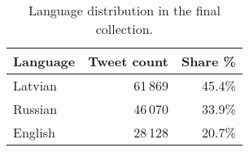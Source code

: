 \begin{table}[ht]
  \centering
  \begin{tabular}{lrr}
    \toprule
    Language & Tweet count & Share \% \\
    \midrule
    Latvian     & 61\,869  & 45.4\%  \\
    Russian     & 46\,070  & 33.9\%  \\
    English     & 28\,128  & 20.7\%  \\
    \bottomrule
  \end{tabular}
  \caption{Language distribution in the final collection.}
  \label{tab:language-counts}
\end{table}